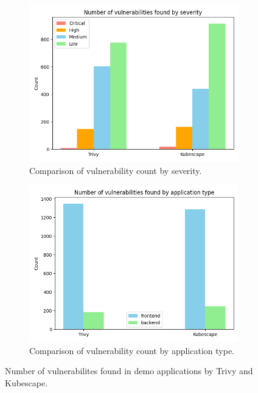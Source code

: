 \begin{figure}[!h]
        \centering
        \begin{subfigure}{.4\textwidth}
        \centering
        \includegraphics[width=\textwidth]{images/vulnerabilities-by-severity.png}
        \caption{Comparison of vulnerability count by severity.}
        \label{img:vulnerabilites-by-severity}
        \end{subfigure}
        \begin{subfigure}{.4\textwidth}
        \centering
        \includegraphics[width=\textwidth]{images/vulnerabilities-by-application-type.png}
        \caption{Comparison of vulnerability count by application type.}
        \label{img:vulnerabilites-by-application-type}
        \end{subfigure}
        \caption{Number of vulnerabilites found in demo applications by Trivy and Kubescape.}
        \label{fig:vulnerability-comparison}
\end{figure}

